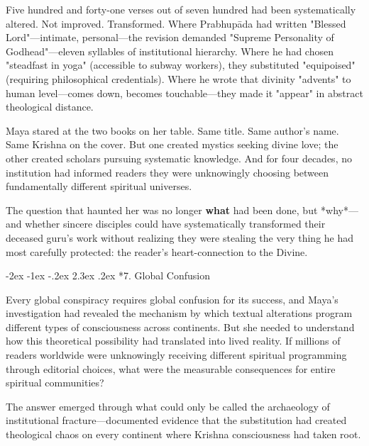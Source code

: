 \documentclass[12pt,twoside]{book}
\makeatletter
\def\cleardoublepage{\clearpage\if@twoside \ifodd\c@page\else\hbox{}\thispagestyle{empty}\newpage\if@twocolumn\hbox{}\newpage\fi\fi\fi}
\renewcommand\section{\@startsection{section}{1}{\z@}%
{-2ex \@plus -1ex \@minus -.2ex}%
{2.3ex \@plus.2ex}%
{\normalfont\Large\bfseries}}
\makeatother
\begin{document}
Five hundred and forty-one verses out of seven hundred had been systematically altered. Not improved. Transformed. Where Prabhupāda had written "Blessed Lord"—intimate, personal—the revision demanded "Supreme Personality of Godhead"—eleven syllables of institutional hierarchy. Where he had chosen "steadfast in yoga" (accessible to subway workers), they substituted "equipoised" (requiring philosophical credentials). Where he wrote that divinity "advents" to human level—comes down, becomes touchable—they made it "appear" in abstract theological distance.

Maya stared at the two books on her table. Same title. Same author's name. Same Krishna on the cover. But one created mystics seeking divine love; the other created scholars pursuing systematic knowledge. And for four decades, no institution had informed readers they were unknowingly choosing between fundamentally different spiritual universes.

The question that haunted her was no longer \textbf{what} had been done, but *why*—and whether sincere disciples could have systematically transformed their deceased guru's work without realizing they were stealing the very thing he had most carefully protected: the reader's heart-connection to the Divine.

\cleardoublepage
\vspace*{0.20\textheight}
\section*{7. Global Confusion}
\thispagestyle{chapterpage}

\vspace{0.3cm}

\normalfont\justifying
Every global conspiracy requires global confusion for its success, and Maya's investigation had revealed the mechanism by which textual alterations program different types of consciousness across continents. But she needed to understand how this theoretical possibility had translated into lived reality. If millions of readers worldwide were unknowingly receiving different spiritual programming through editorial choices, what were the measurable consequences for entire spiritual communities?

The answer emerged through what could only be called the archaeology of institutional fracture—documented evidence that the substitution had created theological chaos on every continent where Krishna consciousness had taken root.
\end{document}
